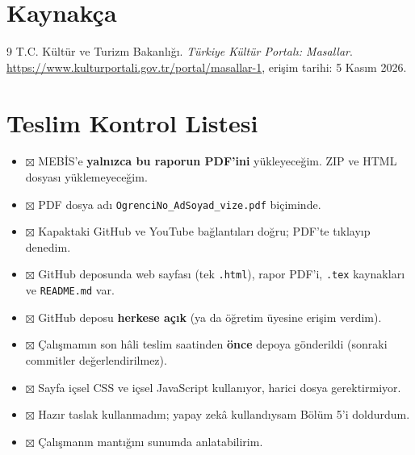 \documentclass[12pt,a4paper]{article}
\begin{document}
\section{Kaynakça}
\begin{thebibliography}{9}
 T.C. Kültür ve Turizm Bakanlığı. \emph{Türkiye Kültür Portalı: Masallar}.
\url{https://www.kulturportali.gov.tr/portal/masallar-1}, erişim tarihi: 5 Kasım 2026.
\end{thebibliography}

\appendix
\section{Teslim Kontrol Listesi}
\begin{itemize}[label={}]
  \item $\boxtimes$ MEBİS'e \textbf{yalnızca bu raporun PDF'ini} yükleyeceğim. ZIP ve HTML dosyası yüklemeyeceğim.
  \item $\boxtimes$ PDF dosya adı \texttt{OgrenciNo\_AdSoyad\_vize.pdf} biçiminde.
  \item $\boxtimes$ Kapaktaki GitHub ve YouTube bağlantıları doğru; PDF'te tıklayıp denedim.
  \item $\boxtimes$ GitHub deposunda web sayfası (tek \texttt{.html}), rapor PDF'i, \texttt{.tex} kaynakları ve \texttt{README.md} var.
  \item $\boxtimes$ GitHub deposu \textbf{herkese açık} (ya da öğretim üyesine erişim verdim).
  \item $\boxtimes$ Çalışmamın son hâli teslim saatinden \textbf{önce} depoya gönderildi (sonraki commitler değerlendirilmez).
  \item $\boxtimes$ Sayfa içsel CSS ve içsel JavaScript kullanıyor, harici dosya gerektirmiyor.
  \item $\boxtimes$ Hazır taslak kullanmadım; yapay zekâ kullandıysam Bölüm 5'i doldurdum.
  \item $\boxtimes$ Çalışmanın mantığını sunumda anlatabilirim.
\end{itemize}
\end{document}

